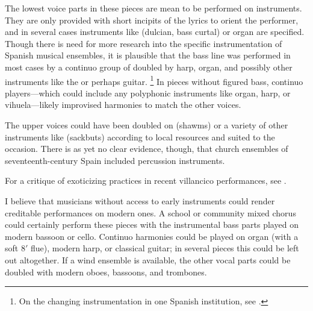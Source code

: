 The lowest voice parts in these pieces are mean to be performed on instruments. 
They are only provided with short incipits of the lyrics to orient the 
performer, and in several cases instruments like  (dulcian, bass 
curtal) or organ are specified.
Though there is need for more research into the specific instrumentation of 
Spanish musical ensembles, it is plausible that the bass line was performed in 
most cases by a continuo group of  doubled by harp, organ, and 
possibly other instruments like the  or perhaps guitar.%
  \footnote{On the changing instrumentation in one Spanish institution, see 
\autocite{Torrente:PhD}.}
In pieces without figured bass, continuo players---which could include any
polyphonic instruments like organ, harp, or vihuela---likely improvised
harmonies to match the other voices.

The upper voices could have been doubled on  (shawms) or a 
variety of other instruments like  (sackbuts) according to 
local resources and suited to the occasion.
There is as yet no clear evidence, though, that church ensembles of 
seventeenth-century Spain included percussion instruments.%
  \begin{Footnote}
      For a critique of exoticizing practices in recent villancico performances,  
      see \autocite{Baker:PerformancePostColonial}.
  \end{Footnote}

I believe that musicians without access to early instruments could render 
creditable performances on modern ones.
A school or community mixed chorus could certainly perform these pieces with 
the instrumental bass parts played on modern bassoon or cello.
Continuo harmonies could be played on organ (with a soft 8$'$ flue), modern 
harp, or classical guitar; in several pieces this could be left out altogether.
If a wind ensemble is available, the other vocal parts could be doubled with 
modern oboes, bassoons, and trombones.



